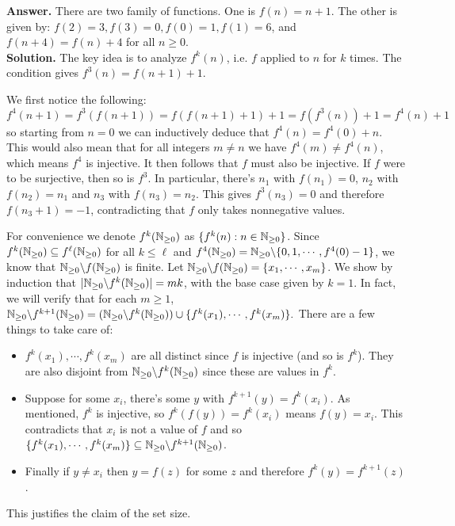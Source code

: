 \documentclass[11pt,a4paper]{article}
\begin{document}
\begin{enumerate}
	\textbf{Answer.} There are two family of functions. One is $f(n)=n+1$. The other is given by: $f(2)=3, f(3)=0, f(0)=1, f(1)=6$, and $f(n+4)=f(n)+4$ for all $n\ge 0$. \\
	\textbf{Solution.} The key idea is to analyze $f^k(n)$, i.e. $f$ applied to $n$ for $k$ times. 
	The condition gives $f^3(n)=f(n+1)+1$. 
	
	We first notice the following: 
	\[
	f^4(n+1)=f^3(f(n+1))=f(f(n+1)+1)+1
	=f(f^3(n))+1
	=f^4(n)+1
	\]
	so starting from $n=0$ we can inductively deduce that $f^4(n)=f^4(0)+n$. 
	This would also mean that for all integers $m\neq n$ we have $f^4(m)\neq f^4(n)$, which means $f^4$ is injective. It then follows that $f$ must also be injective. 
	If $f$ were to be surjective, then so is $f^3$. In particular, there's $n_1$ with $f(n_1)=0$, $n_2$ with $f(n_2)=n_1$ and $n_3$ with $f(n_3)=n_2$. 
	This gives $f^3(n_3)=0$ and therefore $f(n_3+1)=-1$, contradicting that $f$ only takes nonnegative values. 
	
	For convenience we denote $f^k(\mathbb{N}_{\ge 0})$ as $\{f^k(n): n\in \mathbb{N}_{\ge 0}\}$. 
	Since $f^k(\mathbb{N}_{\ge 0})\subseteq f^{\ell}(\mathbb{N}_{\ge 0})$ for all $k\le \ell$ and $f^4(\mathbb{N}_{\ge 0})=\mathbb{N}_{\ge 0}\backslash \{0, 1, \cdots , f^4(0)-1\}$, we know that $\mathbb{N}_{\ge 0}\backslash f(\mathbb{N}_{\ge 0})$ is finite. 
	Let $\mathbb{N}_{\ge 0}\backslash f(\mathbb{N}_{\ge 0}) = \{x_1, \cdots , x_m\}$. 
	We show by induction that $|\mathbb{N}_{\ge 0}\backslash f^k(\mathbb{N}_{\ge 0})| = mk$, with the base case given by $k=1$. 
	In fact, we will verify that for each $m\ge 1$, $\mathbb{N}_{\ge 0}\backslash f^{k+1}(\mathbb{N}_{\ge 0}) = (\mathbb{N}_{\ge 0}\backslash f^{k}(\mathbb{N}_{\ge 0}))\cup \{f^k(x_1), \cdots , f^k(x_m)\}.$ There are a few things to take care of: 
	\begin{itemize}
		\item $f^k(x_1), \cdots , f^k(x_m)$ are all distinct since $f$ is injective (and so is $f^k$). They are also disjoint from $\mathbb{N}_{\ge 0}\backslash f^{k}(\mathbb{N}_{\ge 0})$ since these are values in $f^k$. 
		
		\item Suppose for some $x_i$, there's some $y$ with $f^{k+1}(y)=f^k(x_i)$. 
		As mentioned, $f^k$ is injective, so $f^k(f(y)) = f^k(x_i)$ means $f(y)=x_i$. This contradicts that $x_i$ is not a value of $f$ and so $\{f^k(x_1), \cdots , f^k(x_m)\}\subseteq \mathbb{N}_{\ge 0}\backslash f^{k+1}(\mathbb{N}_{\ge 0})$. 
		
		\item Finally if $y\neq x_i$ then $y=f(z)$ for some $z$ and therefore $f^k (y)=f^{k+1}(z)$. 
	\end{itemize}
	This justifies the claim of the set size. 
	

\end{enumerate}
\end{document}
